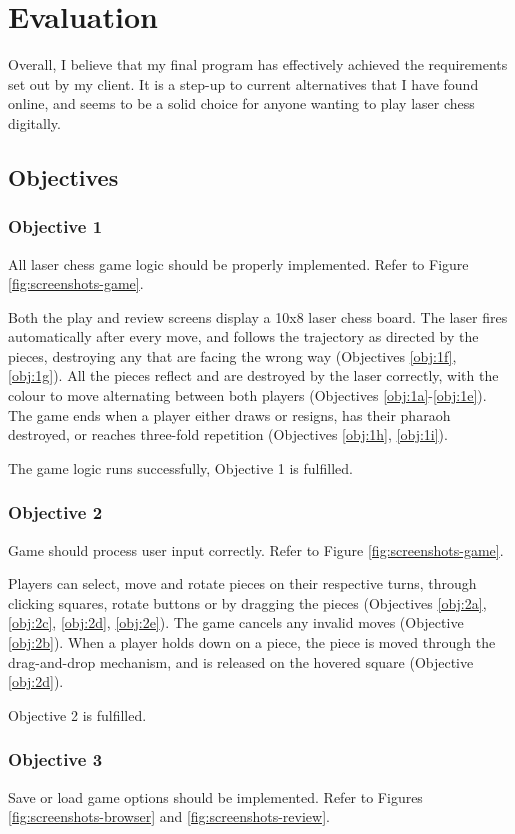 \documentclass[../main/main.tex]{subfiles}
\begin{document}
\newpage
\chapter{Evaluation}
Overall, I believe that my final program has effectively achieved the requirements set out by my client. It is a step-up to current alternatives that I have found online, and seems to be a solid choice for anyone wanting to play laser chess digitally.

\section{Objectives}
\subsection{Objective 1}
All laser chess game logic should be properly implemented. Refer to Figure \ref{fig:screenshots-game}.

Both the play and review screens display a 10x8 laser chess board. The laser fires automatically after every move, and follows the trajectory as directed by the pieces, destroying any that are facing the wrong way (Objectives \ref{obj:1f}, \ref{obj:1g}). All the pieces reflect and are destroyed by the laser correctly, with the colour to move alternating between both players (Objectives \ref{obj:1a}-\ref{obj:1e}). The game ends when a player either draws or resigns, has their pharaoh destroyed, or reaches three-fold repetition (Objectives \ref{obj:1h}, \ref{obj:1i}).

The game logic runs successfully, Objective 1 is fulfilled.

\subsection{Objective 2}
Game should process user input correctly. Refer to Figure \ref{fig:screenshots-game}.

Players can select, move and rotate pieces on their respective turns, through clicking squares, rotate buttons or by dragging the pieces (Objectives \ref{obj:2a}, \ref{obj:2c}, \ref{obj:2d}, \ref{obj:2e}). The game cancels any invalid moves (Objective \ref{obj:2b}). When a player holds down on a piece, the piece is moved through the drag-and-drop mechanism, and is released on the hovered square (Objective \ref{obj:2d}).

Objective 2 is fulfilled.

\subsection{Objective 3}
Save or load game options should be implemented. Refer to Figures \ref{fig:screenshots-browser} and \ref{fig:screenshots-review}.
\end{document}
